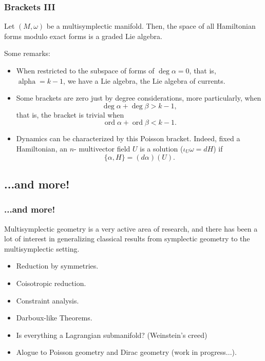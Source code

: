 \begin{frame}
    \frametitle{Brackets III}
    \begin{theorem} Let $(M, \omega)$ be a multisymplectic manifold. Then, the space of all Hamiltonian forms 
        \alert{modulo exact forms} is a graded Lie algebra.
    \end{theorem}
    Some remarks:
    \begin{itemize}
        \item When restricted to the subspace of forms of $\deg \alpha = 0$, that is, $\operatorname{alpha} = k-1$, 
        we have a Lie algebra, \alert{the Lie algebra of currents}.
        \item Some brackets are zero just by degree considerations, more particularly, when $$\deg \alpha + \deg \beta > k -1,$$
        that is, the bracket is trivial when $$\operatorname{ord} \alpha + \operatorname{ord} \beta < k-1.$$
        \item Dynamics can be characterized by this {Poisson bracket}. Indeed, fixed a Hamiltonian, an $n$-
        multivector field $U$ is a solution ($\iota_U \omega = dH$) if $$\{\alpha, H\} = (d \alpha)(U).$$
    \end{itemize}
\end{frame}

\subsection{...and more!}
\begin{frame}
    \frametitle{...and more!}
    Multisymplectic geometry is a very active area of research, and there has been a lot of interest
    in generalizing classical results from symplectic geometry to the multisymplectic setting.
    \begin{itemize}
        \item Reduction by symmetries.
        \item Coisotropic reduction.
        \item Constraint analysis.
        \item Darboux-like Theorems.
        \item Is everything a Lagrangian submanifold? (Weinstein's creed)
        \item Alogue to Poisson geometry and Dirac geometry (work in progress...).
    \end{itemize}
\end{frame}

